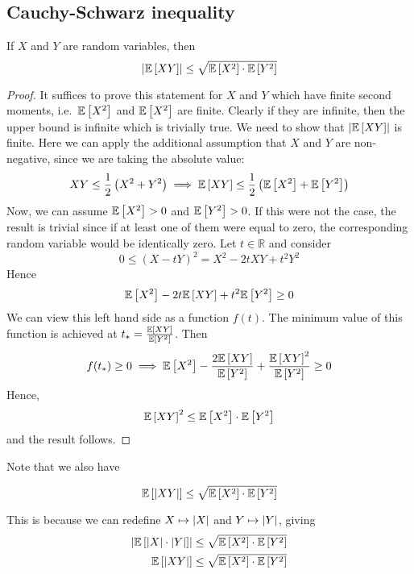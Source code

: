 \subsection{Cauchy-Schwarz inequality}
\begin{theorem}
	If \(X\) and \(Y\) are random variables, then
	\[
		\abs{\mathbb{E}\left[{XY}\right]} \leq \sqrt{\mathbb{E}\left[{X^2}\right]\cdot\mathbb{E}\left[{Y^2}\right]}
	\]
\end{theorem}
\begin{proof}
	It suffices to prove this statement for \(X\) and \(Y\) which have finite second moments, i.e.\ \(\mathbb{E}\left[{X^2}\right]\) and \(\mathbb{E}\left[{X^2}\right]\) are finite.
	Clearly if they are infinite, then the upper bound is infinite which is trivially true.
	We need to show that \(\abs{\mathbb{E}\left[{XY}\right]}\) is finite.
	Here we can apply the additional assumption that \(X\) and \(Y\) are non-negative, since we are taking the absolute value:
	\[
		XY \leq \frac{1}{2}\left(X^2 + Y^2\right) \implies \mathbb{E}\left[{XY}\right] \leq \frac{1}{2}\left( \mathbb{E}\left[{X^2}\right] + \mathbb{E}\left[{Y^2}\right]  \right)
	\]
	Now, we can assume \(\mathbb{E}\left[{X^2}\right] > 0\) and \(\mathbb{E}\left[{Y^2}\right] > 0\).
	If this were not the case, the result is trivial since if at least one of them were equal to zero, the corresponding random variable would be identically zero.
	Let \(t \in \mathbb R\) and consider
	\[
		0 \leq (X - tY)^2 = X^2 - 2tXY + t^2Y^2
	\]
	Hence
	\[
		\mathbb{E}\left[{X^2}\right] - 2t\mathbb{E}\left[{XY}\right] + t^2\mathbb{E}\left[{Y^2}\right] \geq 0
	\]
	We can view this left hand side as a function \(f(t)\).
	The minimum value of this function is achieved at \(t_\ast = \frac{\mathbb{E}\left[{XY}\right]}{\mathbb{E}\left[{Y^2}\right]}\).
	Then
	\[
		f(t_\ast) \geq 0 \implies \mathbb{E}\left[{X^2}\right] - \frac{2\mathbb{E}\left[{XY}\right]}{\mathbb{E}\left[{Y^2}\right]} + \frac{\mathbb{E}\left[{XY}\right]^2}{\mathbb{E}\left[{Y^2}\right]} \geq 0
	\]
	Hence,
	\[
		\mathbb{E}\left[{XY}\right]^2 \leq \mathbb{E}\left[{X^2}\right]\cdot \mathbb{E}\left[{Y^2}\right]
	\]
	and the result follows.
\end{proof}

Note that we also have

\[
	\mathbb{E}\left[{\abs{XY}}\right] \leq \sqrt{\mathbb{E}\left[{X^2}\right]\cdot\mathbb{E}\left[{Y^2}\right]}
\]

This is because we can redefine \(X \mapsto \abs{X}\) and \(Y \mapsto \abs{Y}\), giving
\begin{align*}
	\abs{\mathbb{E}\left[{\abs{X} \cdot \abs{Y}}\right]} & \leq \sqrt{\mathbb{E}\left[{X^2}\right]\cdot\mathbb{E}\left[{Y^2}\right]} \\
	\mathbb{E}\left[{\abs{XY}}\right]                    & \leq \sqrt{\mathbb{E}\left[{X^2}\right]\cdot\mathbb{E}\left[{Y^2}\right]}
\end{align*}
